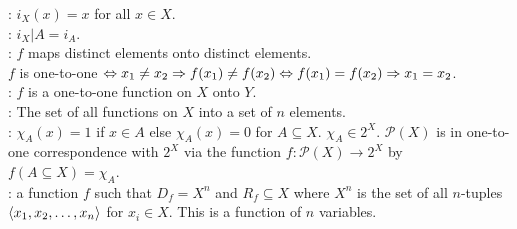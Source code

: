 \documentclass[12pt]{book}
\begin{document}
: $i_X(x) = x$ for all $x\in X$.\\

: $i_X|A = i_A$.\\

: $f$ maps distinct elements onto distinct elements.\\$f$ is one-to-one $\Leftrightarrow x_1\neq x_2 \Rightarrow f(x_1) \neq f(x_2) \Leftrightarrow f(x_1) = f(x_2) \Rightarrow x_1 = x_2$.\\

: $f$ is a one-to-one function on $X$ onto $Y$.\\

: The set of all functions on $X$ into a set of $n$ elements.\\

: $\chi_A(x) = 1$ if $x\in A$ else $\chi_A(x) = 0$ for $A\subseteq X$. $\chi_A \in 2^X$. $\mathcal{P}(X)$ is in one-to-one correspondence with $2^X$ via the function $f:\mathcal{P}(X)\rightarrow 2^X$ by $f(A\subseteq X) = \chi_A$.\\

: a function $f$ such that $D_f = X^n$ and $R_f\subseteq X$ where $X^n$ is the set of all $n$-tuples $\langle x_1, x_2, \dots, x_n\rangle$ for $x_i\in X$. This is a function of $n$ variables.
\end{document}

